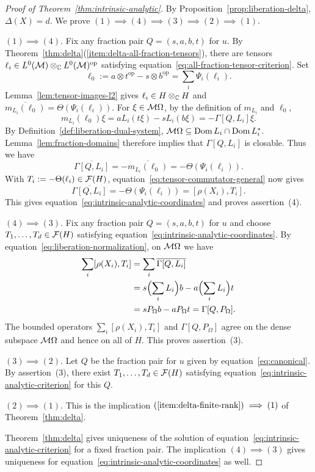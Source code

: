 \begin{proof}[Proof of Theorem~\ref{thm:intrinsic-analytic}]
By Proposition~\ref{prop:liberation-delta}, $\Delta(X)=d$.
We prove $(1)\implies(4)\implies(3)\implies(2)\implies(1)$.

$(1)\implies(4)$.
Fix any fraction pair $Q=(s,a,b,t)$ for $u$.
By Theorem~\ref{thm:delta}\textup{(\ref{item:delta-all-fraction-tensors})}, there are tensors $\ell_i\in L^0(\mathcal M)\otimes_{\mathbb C}L^0(\mathcal M)^{\mathrm{op}}$ satisfying equation~\eqref{eq:all-fraction-tensor-criterion}.
Set
\[
 \ell_0:=a\otimes t^{\mathrm{op}}-s\otimes b^{\mathrm{op}}
   =\sum_i\Psi_i(\ell_i).
\]
Lemma~\ref{lem:tensor-images-l2} gives $\ell_i\in H\otimes_{\mathbb C}H$ and $\overline{m_{L_i}(\ell_0)}=\Theta(\Psi_i(\ell_i))$.
For $\xi\in\mathcal M\Omega$, by the definition of $m_{L_i}$ and $\ell_0$,
\[
 m_{L_i}(\ell_0)\xi
 = aL_i(t\xi)-sL_i(b\xi)
 = -\Gamma[Q,L_i]\xi.
\]
By Definition~\ref{def:liberation-dual-system}, $\mathcal M\Omega\subseteq\operatorname{Dom} L_i\cap\operatorname{Dom} L_i^*$.
Lemma~\ref{lem:fraction-domains} therefore implies that $\Gamma[Q,L_i]$ is closable.
Thus we have
\[
\overline{\Gamma[Q,L_i]}=-\overline{m_{L_i}(\ell_0)}=-\Theta(\Psi_i(\ell_i)).
\]
With $T_i:=-\Theta(\ell_i)\in\mathcal F(H)$, equation~\eqref{eq:tensor-commutator-general} now gives
\[
 \overline{\Gamma[Q,L_i]}
 =-\Theta(\Psi_i(\ell_i))
 =[\rho(X_i),T_i].
\]
This gives equation~\eqref{eq:intrinsic-analytic-coordinates} and proves assertion~\textup{(4)}.

$(4)\implies(3)$.
Fix any fraction pair $Q=(s,a,b,t)$ for $u$ and choose $T_1,\ldots,T_d\in\mathcal F(H)$ satisfying equation~\eqref{eq:intrinsic-analytic-coordinates}.
By equation~\eqref{eq:liberation-normalization}, on $\mathcal M\Omega$ we have
\[
 \begin{aligned}
  \sum_i[\rho(X_i),T_i]
  &=\sum_i\overline{\Gamma[Q,L_i]}\\
  &=s\Bigl(\sum_iL_i\Bigr)b-a\Bigl(\sum_iL_i\Bigr)t\\
  &=sP_\Omega b-aP_\Omega t
   =\Gamma[Q,P_\Omega].
 \end{aligned}
\]
The bounded operators $\sum_i[\rho(X_i),T_i]$ and $\Gamma[Q,P_\Omega]$ agree on the dense subspace $\mathcal M\Omega$ and hence on all of $H$.
This proves assertion~\textup{(3)}.

$(3)\implies(2)$.
Let $Q$ be the fraction pair for $u$ given by equation~\eqref{eq:canonical}.
By assertion~\textup{(3)}, there exist $T_1,\ldots,T_d\in\mathcal F(H)$ satisfying equation~\eqref{eq:intrinsic-analytic-criterion} for this $Q$.

$(2)\implies(1)$.
This is the implication $\textup{(\ref{item:delta-finite-rank})}\implies\textup{(1)}$ of Theorem~\ref{thm:delta}.

Theorem~\ref{thm:delta} gives uniqueness of the solution of equation~\eqref{eq:intrinsic-analytic-criterion} for a fixed fraction pair.
The implication $(4)\implies(3)$ gives uniqueness for equation~\eqref{eq:intrinsic-analytic-coordinates} as well.
\end{proof}
